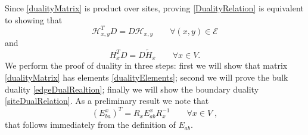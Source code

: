 \documentclass[10pt]{article}
\numberwithin{equation}{section}
\numberwithin{equation}{subsection}
\newcommand{\co}{\;,}
\begin{document}
Since \eqref{dualityMatrix} is product over sites, proving \eqref{DualityRelation} is equivalent to showing that 
\begin{equation}\label{edgeDualRealtion}
    \mathcal{H}_{x,y}^{T}D=D\mathcal{H}_{x,y}\qquad \forall (x,y)\in \mathcal{E}
\end{equation}
and 
\begin{equation}\label{siteDualRelation}
    H_{x}^{T}D=D\widetilde{H}_{x}\qquad \forall x\in V.
\end{equation}
We perform the proof of duality in three steps: first we will show that matrix \eqref{dualityMatrix} has elements \eqref{dualityElements}; second we will prove the bulk duality \eqref{edgeDualRealtion}; finally we will show the boundary duality \eqref{siteDualRelation}. 
As a preliminary result we note that 
\begin{equation}\label{transpositionPropertyR}
(E_{ba}^{x})^{T}=R_{x}E_{ab}^{x}R_{x}^{-1}\qquad \forall x\in V\co
\end{equation}
that follows immediately from the definition of $E_{ab}$. 
\begin{comment}

\begin{align*}
R_{x}E_{ab}^{x}R_{x}^{-1}=&\sum_{r^{x}\in\Omega_{x}}\frac{\xi_{1}^{x}!\ldots r_{N}!}{\nu!}|\xi_{1}^{x},\ldots,\xi_{N}^{x}\rangle \langle \xi_{1}^{x},\ldots, \xi_{N}^{x}|
	\\&
	\sum_{s^{x}\in \Omega_{x},}s_{b}^{x}|s_{1}^{x},\ldots,s_{a}^{x}+1,\ldots,s_{b}^{x}-1,\ldots s_{N}^{x}\rangle \langle s_{1}^{x},\ldots,s_{N}^{x}|
	\\&
	\sum_{n^{x}\in\Omega_{x}}\frac{\nu!}{n_{1}!\ldots n_{N}!}|n_{1}^{x},\ldots,n_{N}^{x}\rangle \langle n_{1}^{x},\ldots, n_{N}^{x}|
 \\=&\sum_{r^{x}\in \Omega_{x}}
	\xi_{a}^{x}|\xi_{1}^{x},\ldots,\xi_{N}^{x}\rangle \langle \xi_{1}^{x},\ldots,\xi_{a}^{x}-1,\ldots,r_{b}^{x}-1,\ldots,\xi_{N}^{x}|
	\\=&
	\left(E_{ba}^{x}\right)^{T}
\end{align*}
where in the up to last equation we used the orthogonality relation \eqref{ortho}. 
\end{comment}
\end{document}

